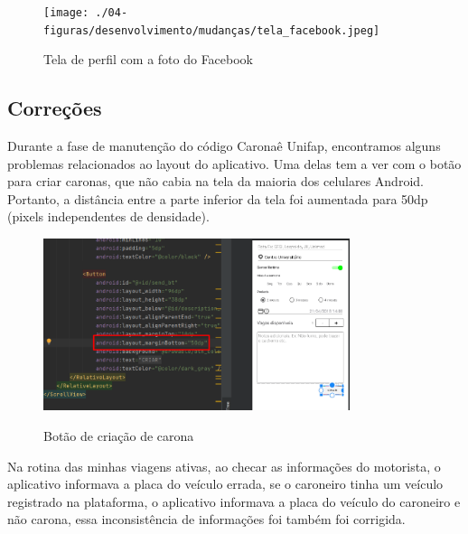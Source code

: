 \begin{figure}[H]
	\centering
	\caption{Tela de perfil com a foto do Facebook }
	\texttt{[image: ./04-figuras/desenvolvimento/mudanças/tela\_facebook.jpeg]}
	\label{fig:facebook}
\end{figure}



	
\subsection{Correções}


Durante a fase de manutenção do código Caronaê Unifap, encontramos alguns problemas relacionados ao layout do aplicativo. Uma delas tem a ver com o botão para criar caronas, que não cabia na tela da maioria dos celulares Android. Portanto, a distância entre a parte inferior da tela foi aumentada para 50dp (pixels independentes de densidade).

\begin{figure}[H]
	\centering
	\caption{Botão de criação de carona}
	\includegraphics[width=0.8\textwidth]{./04-figuras/desenvolvimento/manutencao/man_botao_criacao_carona.png}
	\label{fig:botão_de_criacao_de_carona}
\end{figure}

Na rotina das minhas viagens ativas, ao checar as informações do motorista, o aplicativo informava a placa do veículo errada, se o caroneiro tinha um veículo registrado na plataforma, o aplicativo informava a placa do veículo do caroneiro e não carona, essa inconsistência de informações foi também foi corrigida.

